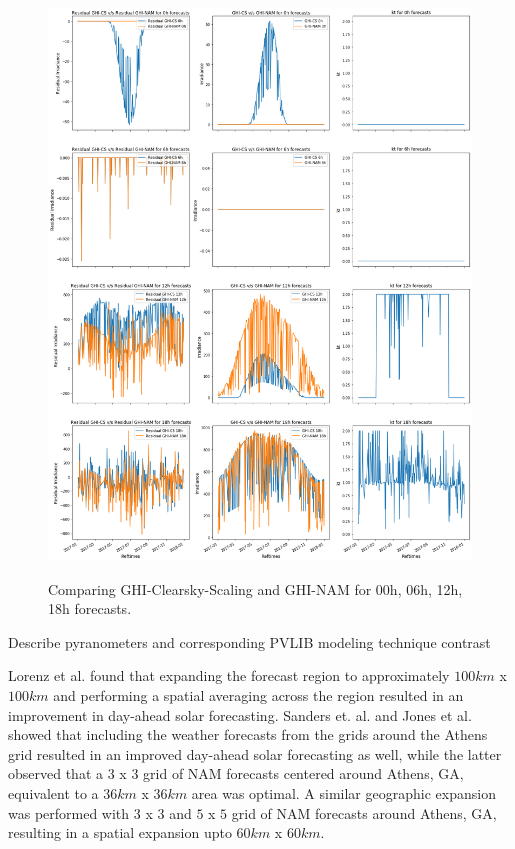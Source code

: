 

\begin{figure}[htbp]
    \begin{center}
    	\includegraphics[width=\textwidth]{chapter3/fig_ghi_comparison.png}
    	\label{fig:fig_ghi_comparison}
    	\caption[Comparing GHI-Clearsky-Scaling and GHI-NAM for 00h, 06h, 12h, 18h forecasts]{Comparing GHI-Clearsky-Scaling and GHI-NAM for 00h, 06h, 12h, 18h forecasts.}
    \end{center}
\end{figure}

\par Describe pyranometers and corresponding PVLIB modeling technique contrast


Lorenz et al. \cite{expansion_lorenz} found that expanding the forecast region to approximately $100 km$ x $100 km$ and performing a spatial averaging across the region resulted in an improvement in day-ahead solar forecasting. Sanders et. al. \cite{publication_sanders} and Jones et al. \cite{thesis_zach} showed that including the weather forecasts from the grids around the Athens grid resulted in an improved day-ahead solar forecasting as well, while the latter observed that a $3$ x $3$ grid of NAM forecasts centered around Athens, GA, equivalent to a $36km$ x $36km$ area was optimal. A similar geographic expansion was performed with $3$ x $3$ and $5$ x $5$ grid of NAM forecasts around Athens, GA, resulting in a spatial expansion upto $60km$ x $60km$.

